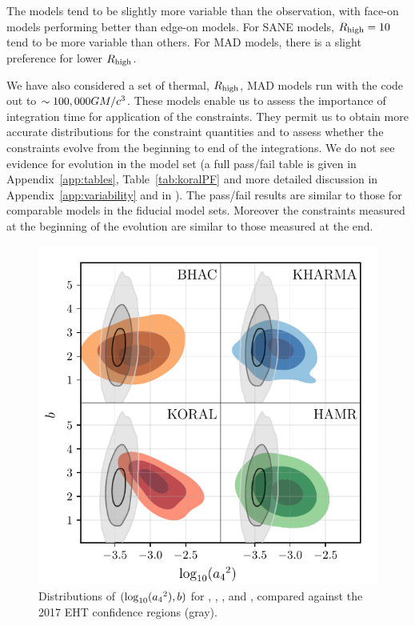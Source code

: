 The models tend to be slightly more variable than the observation, with face-on models performing better than edge-on models.
For SANE models, $R_\mathrm{high} = 10$ tend to be more variable than others.
For MAD models, there is a slight preference for lower $R_\mathrm{high}$.

We have also considered a set of thermal, $R_\mathrm{high}$, MAD models run with the \koral code out to $\sim 100,000GM/c^3$.
These models enable us to assess the importance of integration time for application of the constraints.
They permit us to obtain more accurate distributions for the constraint quantities and to assess whether the constraints evolve from the beginning to end of the integrations.
We do not see evidence for evolution in the \koral model set (a full pass/fail table is given in Appendix~\ref{app:tables}, Table~\ref{tab:koralPF} and more detailed discussion in Appendix~\ref{app:variability} and in \citet{Georgiev_2022}).
The \koral pass/fail results are similar to those for comparable models in the fiducial model sets.
Moreover the constraints measured at the beginning of the evolution are similar to those measured at the end.

\begin{figure}
  \centering
  \includegraphics[width=\columnwidth]{./figures/grmhd_triangle_debiased_combined.pdf}
  \caption{Distributions of $(\log_{10}({a_4}^2),b)$ for \bhac, \kharma, \koral, and \hamr, compared against the 2017 EHT confidence regions (gray).}
  \label{fig:cmp_VLBI_var}
\end{figure}

